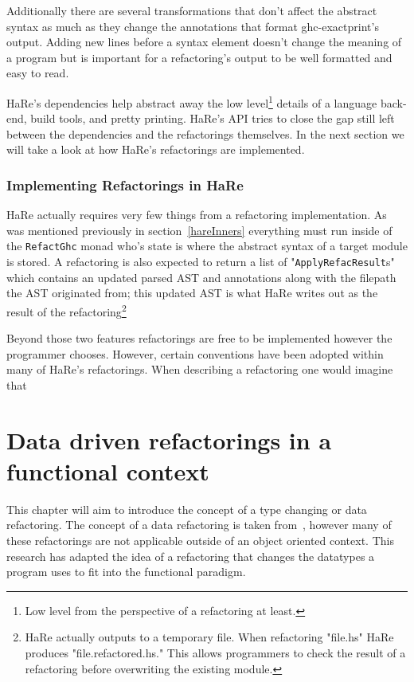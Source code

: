 Additionally there are several transformations that don't affect the abstract syntax as much as they change the annotations that format ghc-exactprint's output. Adding new lines before a syntax element doesn't change the meaning of a program but is important for a refactoring's output to be well formatted and easy to read. 

HaRe's dependencies help abstract away the low level\footnote{Low level from the perspective of a refactoring at least.} details of a language back-end, build tools, and pretty printing. HaRe's API tries to close the gap still left between the dependencies and the refactorings themselves. In the next section we will take a look at how HaRe's refactorings are implemented.

\subsection{Implementing Refactorings in HaRe}

HaRe actually requires very few things from a refactoring implementation. As was mentioned previously in section~\ref{hareInners} everything must run inside of the \texttt{RefactGhc} monad who's state is where the abstract syntax of a target module is stored. A refactoring is also expected to return a list of  "\texttt{ApplyRefacResult}s" which contains an updated parsed AST and annotations along with the filepath the AST originated from; this updated AST is what HaRe writes out as the result of the refactoring\footnote{HaRe actually outputs to a temporary file. When refactoring "file.hs" HaRe produces "file.refactored.hs." This allows programmers to check the result of a refactoring before overwriting the existing module.}  


Beyond those two features refactorings are free to be implemented however the programmer chooses. However, certain conventions have been adopted within many of HaRe's refactorings. When describing a refactoring one would imagine that 

\chapter{Data driven refactorings in a functional context}
This chapter will aim to introduce the concept of a type changing or data refactoring. The concept of a data refactoring is taken from~\cite{fowler}, however many of these refactorings are not applicable outside of an object oriented context. This research has adapted the idea of a refactoring that changes the datatypes a program uses to fit into the functional paradigm.

